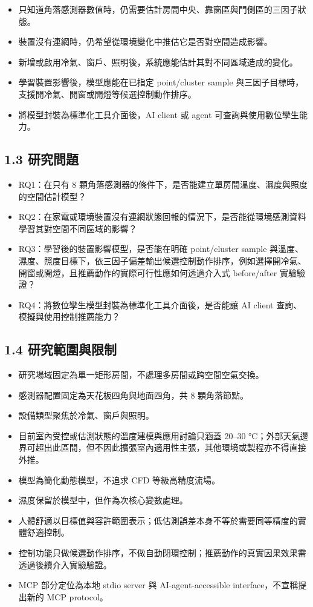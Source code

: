 \documentclass[12pt,a4paper]{article}
\begin{document}
\begin{itemize}
\item 只知道角落感測器數值時，仍需要估計房間中央、靠窗區與門側區的三因子狀態。
\item 裝置沒有連網時，仍希望從環境變化中推估它是否對空間造成影響。
\item 新增或啟用冷氣、窗戶、照明後，系統應能估計其對不同區域造成的變化。
\item 學習裝置影響後，模型應能在已指定 point/cluster sample 與三因子目標時，支援開冷氣、開窗或開燈等候選控制動作排序。
\item 將模型封裝為標準化工具介面後，AI client 或 agent 可查詢與使用數位孿生能力。
\end{itemize}

\subsection*{1.3 研究問題}

\begin{itemize}
\item RQ1：在只有 8 顆角落感測器的條件下，是否能建立單房間溫度、濕度與照度的空間估計模型？
\item RQ2：在家電或環境裝置沒有連網狀態回報的情況下，是否能從環境感測資料學習其對空間不同區域的影響？
\item RQ3：學習後的裝置影響模型，是否能在明確 point/cluster sample 與溫度、濕度、照度目標下，依三因子偏差輸出候選控制動作排序，例如選擇開冷氣、開窗或開燈，且推薦動作的實際可行性應如何透過介入式 before/after 實驗驗證？
\item RQ4：將數位孿生模型封裝為標準化工具介面後，是否能讓 AI client 查詢、模擬與使用控制推薦能力？
\end{itemize}

\subsection*{1.4 研究範圍與限制}

\begin{itemize}
\item 研究場域固定為單一矩形房間，不處理多房間或跨空間空氣交換。
\item 感測器配置固定為天花板四角與地面四角，共 8 顆角落節點。
\item 設備類型聚焦於冷氣、窗戶與照明。
\item 目前室內受控或估測狀態的溫度建模與應用討論只涵蓋 20–30 °C；外部天氣邊界可超出此區間，但不因此擴張室內適用性主張，其他環境或製程亦不得直接外推。
\item 模型為簡化動態模型，不追求 CFD 等級高精度流場。
\item 濕度保留於模型中，但作為次核心變數處理。
\item 人體舒適以目標值與容許範圍表示；低估測誤差本身不等於需要同等精度的實體舒適控制。
\item 控制功能只做候選動作排序，不做自動閉環控制；推薦動作的真實因果效果需透過後續介入實驗驗證。
\item MCP 部分定位為本地 stdio server 與 AI-agent-accessible interface，不宣稱提出新的 MCP protocol。
\end{itemize}
\end{document}
